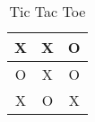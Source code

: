 \begin{table}[h]
    \centering
    \begin{tabular}{|c|c|c|}
        \hline
         X & X & O \\
        \hline
         O & X & O \\
        \hline
         X & O & X \\
        \hline
    \end{tabular}
    \caption{Tic Tac Toe}
    \label{tab:tablica}
\end{table}
